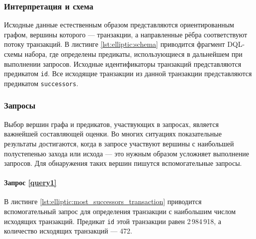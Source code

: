 \subsubsection{Интерпретация и схема}

Исходные данные естественным образом представляются ориентированным графом, вершины которого --- транзакции, а
направленные рёбра соответствуют потоку транзакций. В листинге \ref{lst:elliptic:schema} приводится фрагмент DQL-схемы
набора, где определены предикаты, использующиеся в дальнейшем при выполнении запросов. Исходные идентификаторы
транзакций представляются предикатом \texttt{id}. Все исходящие транзакции из данной транзакции представляются
предикатом \texttt{successors}.


\subsubsection{Запросы}

Выбор вершин графа и предикатов, участвующих в запросах, является важнейшей составляющей оценки. Во многих
ситуациях показательные результаты достигаются, когда в запросе участвуют вершины с наибольшей полустепенью захода или
исхода --- это нужным образом усложняет выполнение запросов. Для обнаружения таких вершин пишутся вспомогательные
запросы.

\paragraph{Запрос \ref{query1}}

В листинге \ref{lst:elliptic:most_successors_transaction} приводится вспомогательный запрос для определения транзакции
с наибольшим числом исходящих транзакций. Предикат \texttt{id} этой транзакции равен 2\,984\,918, а количество
исходящих транзакций --- 472.


